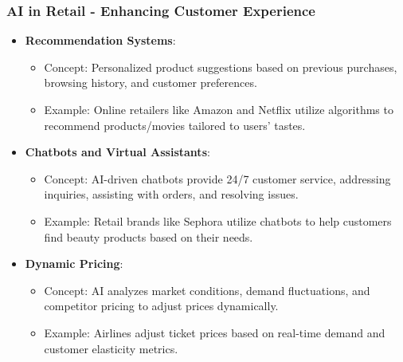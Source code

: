 \documentclass{beamer}
\begin{document}
\begin{frame}[fragile]
    \frametitle{AI in Retail - Enhancing Customer Experience}
    \begin{itemize}
        \item \textbf{Recommendation Systems}:
            \begin{itemize}
                \item Concept: Personalized product suggestions based on previous purchases, browsing history, and customer preferences.
                \item Example: Online retailers like Amazon and Netflix utilize algorithms to recommend products/movies tailored to users' tastes.
            \end{itemize}
        \item \textbf{Chatbots and Virtual Assistants}:
            \begin{itemize}
                \item Concept: AI-driven chatbots provide 24/7 customer service, addressing inquiries, assisting with orders, and resolving issues.
                \item Example: Retail brands like Sephora utilize chatbots to help customers find beauty products based on their needs.
            \end{itemize}
        \item \textbf{Dynamic Pricing}:
            \begin{itemize}
                \item Concept: AI analyzes market conditions, demand fluctuations, and competitor pricing to adjust prices dynamically.
                \item Example: Airlines adjust ticket prices based on real-time demand and customer elasticity metrics.
            \end{itemize}
    \end{itemize}
\end{frame}
\end{document}
